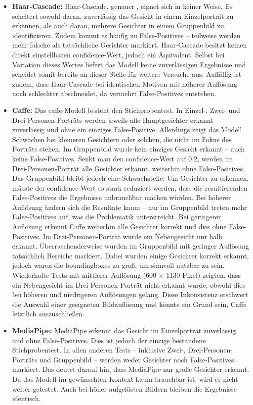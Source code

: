 \begin{itemize}
	\item \textbf{Haar-Cascade:} Haar-Cascade, genauer , eignet sich in keiner Weise. Es scheitert sowohl daran, zuverlässig das Gesicht in einem Einzelporträt zu erkennen, als auch daran, mehrere Gesichter in einem Gruppenbild zu identifizieren. Zudem kommt es häufig zu False-Positives – teilweise werden mehr falsche als tatsächliche Gesichter markiert. Haar-Cascade besitzt keinen direkt einstellbaren \gls{confidence}-Wert, jedoch ein Äquivalent. Selbst bei Variation dieses Wertes liefert das Modell keine zuverlässigen Ergebnisse und scheidet somit bereits an dieser Stelle für weitere Versuche aus. Auffällig ist zudem, dass Haar-Cascade bei identischen Motiven mit höherer Auflösung noch schlechter abschneidet, da vermehrt False-Positives entstehen.
%	
	\item \textbf{Caffe:} Das \gls{caffe}-Modell besteht den Stichprobentest. In Einzel-, Zwei- und Drei-Personen-Porträts werden jeweils alle Hauptgesichter erkannt – zuverlässig und ohne ein einziges False-Positive. Allerdings zeigt das Modell Schwächen bei kleineren Gesichtern oder solchen, die nicht im Fokus des Porträts stehen. Im Gruppenbild wurde kein einziges Gesicht erkannt – auch keine False-Positives. Senkt man den \gls{confidence}-Wert auf 0.2, werden im Drei-Personen-Porträt alle Gesichter erkannt, weiterhin ohne False-Positives. Das Gruppenbild bleibt jedoch eine Schwachstelle: Um Gesichter zu erkennen, müsste der \gls{confidence}-Wert so stark reduziert werden, dass die resultierenden False-Positives die Ergebnisse unbrauchbar machen würden. Bei höherer Auflösung ändern sich die Resultate kaum – nur im Gruppenbild treten mehr False-Positives auf, was die Problematik unterstreicht. Bei geringerer Auflösung erkennt Caffe weiterhin alle Gesichter korrekt und dies ohne False-Positives. Im Drei-Personen-Porträt wurde ein Nebengesicht nur halb erkannt. Überraschenderweise wurden im Gruppenbild mit geringer Auflösung tatsächlich Bereiche markiert. Dabei wurden einige Gesichter korrekt erkannt, jedoch waren die \gls{boundingbox}es zu groß, um sinnvoll nutzbar zu sein. Wiederholte Tests mit mittlerer Auflösung (600 × 1130 Pixel) zeigten, dass ein Nebengesicht im Drei-Personen-Porträt nicht erkannt wurde, obwohl dies bei höheren und niedrigeren Auflösungen gelang. Diese Inkonsistenz erschwert die Auswahl einer geeigneten Bildauflösung und könnte ein Grund sein, Caffe letztlich auszuschließen.
%	
	\item \textbf{MediaPipe:} MediaPipe erkennt das Gesicht im Einzelporträt zuverlässig und ohne False-Positives. Dies ist jedoch der einzige bestandene Stichprobentest. In allen anderen Tests – inklusive Zwei-, Drei-Personen-Porträts und Gruppenbild – werden weder Gesichter noch False-Positives markiert. Das deutet darauf hin, dass MediaPipe nur große Gesichter erkennt. Da das Modell im gewünschten Kontext kaum brauchbar ist, wird es nicht weiter getestet. Auch bei höher aufgelösten Bildern bleiben die Ergebnisse identisch.

\end{itemize}
